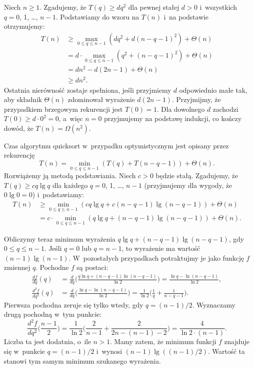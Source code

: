 
\exercise %
Niech $n\ge1$.
Zgadujemy, że $T(q)\ge dq^2$ dla pewnej stałej $d>0$ i~wszystkich $q=0$, 1, \dots, $n-1$.
Podstawiamy do wzoru na $T(n)$ i~na podstawie  otrzymujemy:
\begin{align*}
	T(n) &\ge \max_{0\le q\le n-1}(dq^2+d(n-q-1)^2)+\Theta(n) \\
	&= d\cdot\!\!\!\max_{0\le q\le n-1}(q^2+(n-q-1)^2)+\Theta(n) \\
	&= dn^2-d(2n-1)+\Theta(n) \\
	&\ge dn^2.
\end{align*}
Ostatnia nierówność zostaje spełniona, jeśli przyjmiemy $d$ odpowiednio małe tak, aby składnik $\Theta(n)$ zdominował wyrażenie $d(2n-1)$.
Przyjmijmy, że przypadkiem brzegowym rekurencji jest $T(0)=1$.
Dla dowolnego $d$ zachodzi $T(0)\ge d\cdot0^2=0$, a~więc $n=0$ przyjmujemy na podstawę indukcji, co kończy dowód, że $T(n)=\Omega(n^2)$.

\exercise %
Czas algorytmu quicksort w~przypadku optymistycznym jest opisany przez rekurencję
\[
    T(n) = \min_{0\le q\le n-1}(T(q)+T(n-q-1))+\Theta(n).
\]
Rozwiążemy ją metodą podstawiania.
Niech $c>0$ będzie stałą.
Zgadujemy, że $T(q)\ge cq\lg q$ dla każdego $q=0$, 1, \dots, $n-1$ (przyjmujemy dla wygody, że $0\lg0=0$) i~podstawiamy:
\begin{align*}
    T(n) &\ge \min_{0\le q\le n-1}(cq\lg q+c(n-q-1)\lg(n-q-1))+\Theta(n) \\
	&= c\cdot\!\!\!\min_{0\le q\le n-1}(q\lg q+(n-q-1)\lg(n-q-1))+\Theta(n).
\end{align*}

Obliczymy teraz minimum wyrażenia $q\lg q+(n-q-1)\lg(n-q-1)$, gdy $0\le q\le n-1$.
Jeśli $q=0$ lub $q=n-1$, to wyrażenie ma wartość $(n-1)\lg(n-1)$.
W~pozostałych przypadkach potraktujmy je jako funkcję $f$ zmiennej $q$.
Pochodne $f$ są postaci:
\begin{align*}
    \frac{df}{dq}(q) &= \frac{d}{dq}\biggl(\frac{q\ln q+(n-q-1)\ln(n-q-1)}{\ln2}\biggr) = \frac{\ln q-\ln(n-q-1)}{\ln2}, \\[1mm]
	\frac{d^2\!f}{dq^2}(q) &= \frac{d}{dq}\biggl(\frac{\ln q-\ln(n-q-1)}{\ln2}\biggr) = \frac{1}{\ln2}\biggl(\frac{1}{q}+\frac{1}{n-q-1}\biggr).
\end{align*}
Pierwsza pochodna zeruje się tylko wtedy, gdy $q=(n-1)/2$.
Wyznaczamy drugą pochodną w~tym punkcie:
\[
    \frac{d^2\!f}{dq^2}\biggl(\frac{n-1}{2}\biggr) = \frac{1}{\ln2}\biggl(\frac{2}{n-1}+\frac{2}{2n-(n-1)-2}\biggr) = \frac{4}{\ln2\cdot(n-1)}.
\]
Liczba ta jest dodatnia, o~ile $n>1$.
Mamy zatem, że minimum funkcji $f$ znajduje się w~punkcie $q=(n-1)/2$ i~wynosi $(n-1)\lg((n-1)/2)$.
Wartość ta stanowi tym samym minimum szukanego wyrażenia.

